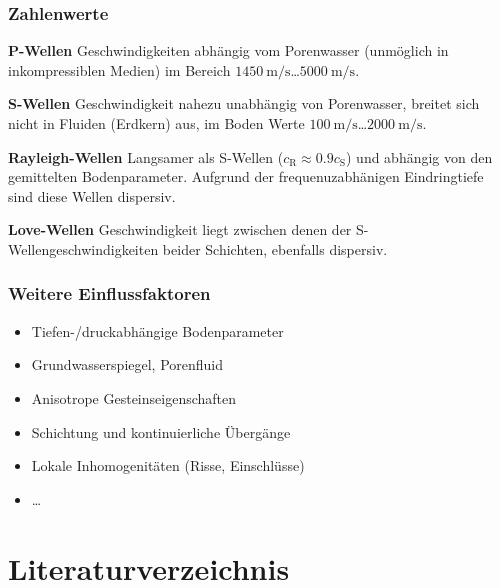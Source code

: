\documentclass[hyperref={pdfpagemode=FullScreen, colorlinks=false}]{beamer}
\begin{document}
\begin{frame}
\frametitle{Zahlenwerte}
\textbf{P-Wellen}
Geschwindigkeiten abhängig vom Porenwasser (unmöglich in inkompressiblen Medien) im Bereich $\SI{1450}{\metre\per\second}$\dots $\SI{5000}{\metre\per\second}$.

\bigskip

\textbf{S-Wellen}
Geschwindigkeit nahezu unabhängig von Porenwasser, breitet sich nicht in Fluiden (Erdkern) aus, im Boden Werte $\SI{100}{\metre\per\second}$\dots $\SI{2000}{\metre\per\second}$.

\bigskip

\textbf{Rayleigh-Wellen}
Langsamer als S-Wellen ($c_\mathrm{R}\approx 0.9 c_\mathrm{S}$) und abhängig von den gemittelten Bodenparameter. Aufgrund der frequenuzabhänigen Eindringtiefe sind diese Wellen dispersiv.

\bigskip

\textbf{Love-Wellen}
Geschwindigkeit liegt zwischen denen der S-Wellengeschwindigkeiten beider Schichten, ebenfalls dispersiv.


\end{frame}



\begin{frame}
\frametitle{Weitere Einflussfaktoren}
\begin{itemize}
 \item Tiefen-/druckabhängige Bodenparameter 
 \item Grundwasserspiegel, Porenfluid
 \item Anisotrope Gesteinseigenschaften
 \item Schichtung und kontinuierliche Übergänge
 \item Lokale Inhomogenitäten (Risse, Einschlüsse)
 \item \dots
\end{itemize}

\end{frame}




\section*{Literaturverzeichnis}

\begin{frame}[allowframebreaks]{}
	\printbibliography
\end{frame}
\end{document}
